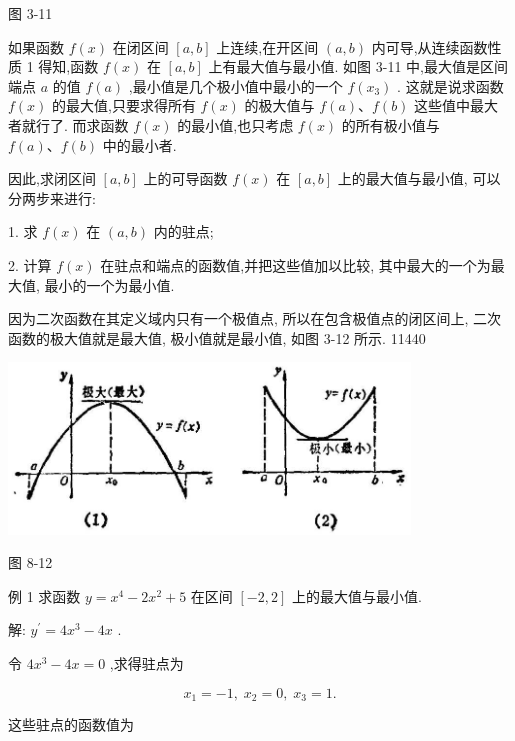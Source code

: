 \documentclass[10pt]{article}
\begin{document}
图 3-11

如果函数 \(f\left( x\right)\) 在闭区间 \(\left\lbrack {a,b}\right\rbrack\) 上连续,在开区间 \(\left( {a,b}\right)\) 内可导,从连续函数性质 1 得知,函数 \(f\left( x\right)\) 在 \(\left\lbrack {a,b}\right\rbrack\) 上有最大值与最小值. 如图 3-11 中,最大值是区间端点 \(a\) 的值 \(f\left( a\right)\) ,最小值是几个极小值中最小的一个 \(f\left( {x}_{3}\right)\) . 这就是说求函数 \(f\left( x\right)\) 的最大值,只要求得所有 \(f\left( x\right)\) 的极大值与 \(f\left( a\right) \text{、}f\left( b\right)\) 这些值中最大者就行了. 而求函数 \(f\left( x\right)\) 的最小值,也只考虑 \(f\left( x\right)\) 的所有极小值与 \(f\left( a\right) \text{、}f\left( b\right)\) 中的最小者.

因此,求闭区间 \(\left\lbrack {a,b}\right\rbrack\) 上的可导函数 \(f\left( x\right)\) 在 \(\left\lbrack {a,b}\right\rbrack\) 上的最大值与最小值, 可以分两步来进行:

1. 求 \(f\left( x\right)\) 在 \(\left( {a,b}\right)\) 内的驻点;

2. 计算 \(f\left( x\right)\) 在驻点和端点的函数值,并把这些值加以比较, 其中最大的一个为最大值, 最小的一个为最小值.

因为二次函数在其定义域内只有一个极值点, 所以在包含极值点的闭区间上, 二次函数的极大值就是最大值, 极小值就是最小值, 如图 3-12 所示. 11440

\begin{center}
\includegraphics[max width=0.8\textwidth]{images/01912c18-5c3f-733d-b775-749ba9897a9d_147_605988.jpg}
\end{center}

图 8-12

例 1 求函数 \(y = {x}^{4} - 2{x}^{2} + 5\) 在区间 \(\left\lbrack {-2,2}\right\rbrack\) 上的最大值与最小值.

解: \({y}^{\prime } = 4{x}^{3} - {4x}\) .

令 \(4{x}^{3} - {4x} = 0\) ,求得驻点为

\[
{x}_{1} = - 1,\;{x}_{2} = 0,\;{x}_{3} = 1.
\]

这些驻点的函数值为
\end{document}
